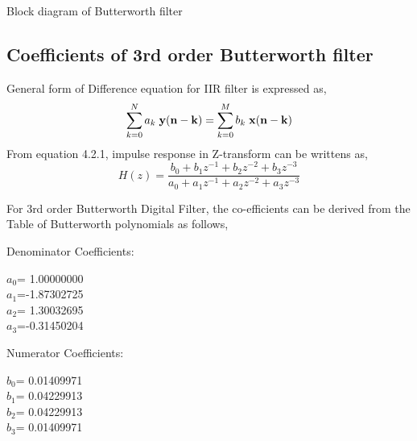 \documentclass[journal,10pt,twocolumn]{article}
\begin{document}
\begin{flushleft}
\hspace{1cm} Block diagram of Butterworth filter  \\
\end{flushleft}

\subsection{Coefficients of 3rd order Butterworth filter} 
\vspace{0.25cm}
\begin{flushleft}
General form of Difference equation for IIR filter is expressed as,\\
\begin{equation}
\sum_{k=0}^{N} {a_k} \hspace{0.1cm} {\vec{y(n-k)}}
=  \sum_{k=0}^{M} {b_k} \hspace{0.1cm} {\vec{x(n-k)}}
\end{equation}
\vspace{0.5cm} 
From equation 4.2.1, impulse response in Z-transform can be writtens as,\\
\begin{equation}
H(z)= \frac{b_0 + b_1 z^{-1} + b_2 z^{-2} + b_3 z^{-3}}{a_0 + a_1 z^{-1}+ a_2 z^{-2} + a_3 z^{-3}}
\end{equation}

For 3rd order Butterworth Digital Filter, the co-efficients can be derived from the Table of Butterworth polynomials as follows,\\
\vspace{1cm}

Denominator Coefficients:\\
\begin{center}
$a_0$= 1.00000000 \\
\vspace{0.15cm}
$a_1$=-1.87302725 \\ 
\vspace{0.15cm}
$a_2$= 1.30032695 \\
\vspace{0.15cm}
$a_3$=-0.31450204 \\
\end{center}
\vspace{0.35cm}
Numerator Coefficients:\\  
\vspace{0.1cm}
\begin{center}
    
$b_0$= 0.01409971 \\ 
\vspace{0.15cm}
$b_1$= 0.04229913 \\
\vspace{0.15cm}
$b_2$= 0.04229913 \\
\vspace{0.15cm}
$b_3$= 0.01409971 \\
\end{center}
\end{flushleft}
\end{document}
